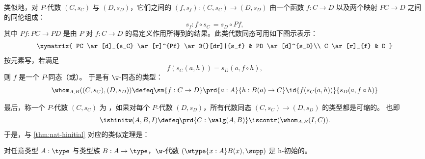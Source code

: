 类似地，对 $P$-代数 $(C,s_C)$ 与 $(D,s_D)$，它们之间的
%
$(f, s_f) : (C, s_C) \rightarrow (D, s_D)$ 由一个函数 $f : C \rightarrow D$ 以及两个映射 $PC \rightarrow D$ 之间的同伦组成：
\[
s_f :  f \circ s_C \, = s_{D} \circ Pf,
\]
其中 $Pf : PC\rightarrow PD$ 是由 $P$ 对 $f: C \rightarrow D$ 的易定义作用所得到的结果。此类代数同态可用如下图示表示：
\[
\xymatrix{
 PC \ar[d]_{s_C} \ar[r]^{Pf}  \ar@{}[dr]|{s_f} &  PD \ar[d]^{s_D}\\
C \ar[r]_{f}   & D }
\]
按元素写，若满足
%
%
\[f(s_C(a,h)) = s_D(a,f \circ h),\]
则 $f$ 是一个 $P$-同态（或）。
于是有 $\w$-同态的类型：
\begin{equation*}
  \whom_{A,B}((C, s_C),(D,s_D)) \defeq \sm{f : C \to D} \prd{a:A}{h:B(a)\to C} \id{f(s_C(a,h))}{s_D(a, f\circ h)}
\end{equation*}

%
最后，称一个 $P$-代数 $(C, s_C)$ 为
%
%
，如果对每个 $P$-代数 $(D, s_D)$，所有代数同态 $(C, s_C) \rightarrow (D, s_D)$ 的类型都是可缩的。
也即
\begin{equation*}
\ishinitw(A,B,I) \defeq \prd{C : \walg(A,B)} \iscontr(\whom_{A,B}(I,C)).
\end{equation*}
%
于是，与 \cref{thm:nat-hinitial} 对应的类似定理是：

\begin{thm}\label{thm:w-hinit}
对任意类型 $A : \type$ 与类型族 $B : A \to \type$，$\w$-代数 $(\wtype{x:A}B(x), \supp)$ 是 h-初始的。
\end{thm}

